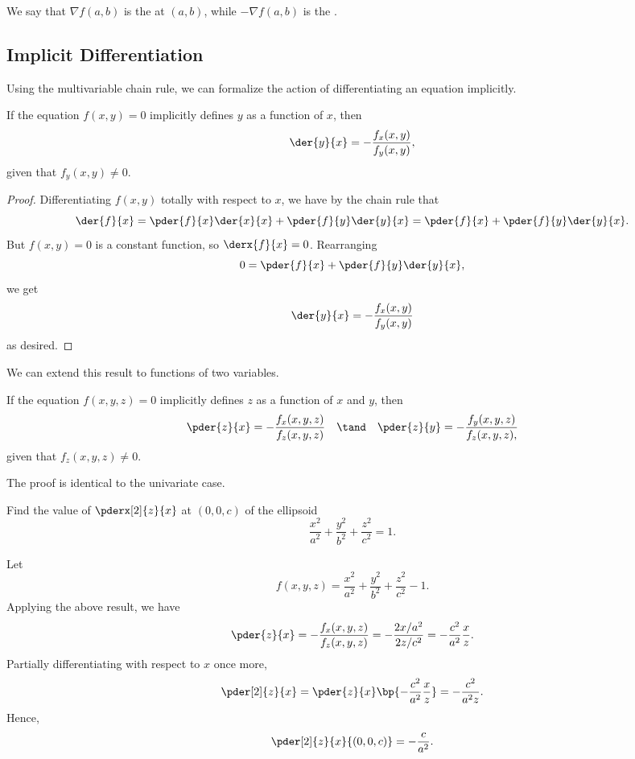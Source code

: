 We say that $\nabla f(a,b)$ is the  at $(a, b)$, while $-\nabla f(a, b)$ is the .

\subsection{Implicit Differentiation}

Using the multivariable chain rule, we can formalize the action of differentiating an equation implicitly.

\begin{proposition}
    If the equation $f(x, y) = 0$ implicitly defines $y$ as a function of $x$, then \[\der{y}{x} = -\frac{f_x(x, y)}{f_y(x,  y)},\] given that $f_y(x, y) \neq 0$.
\end{proposition}
\begin{proof}
    Differentiating $f(x, y)$ totally with respect to $x$, we have by the chain rule that \[\der{f}{x} = \pder{f}{x} \der{x}{x} + \pder{f}{y} \der{y}{x} = \pder{f}{x} + \pder{f}{y} \der{y}{x}.\] But $f(x, y) = 0$ is a constant function, so $\derx{f}{x} = 0$. Rearranging \[0 =\pder{f}{x} + \pder{f}{y} \der{y}{x},\] we get \[\der{y}{x} = -\frac{f_x(x, y)}{f_y(x,  y)}\] as desired.
\end{proof}

We can extend this result to functions of two variables.
\begin{proposition}
    If the equation $f(x, y, z) = 0$ implicitly defines $z$ as a function of $x$ and $y$, then \[\pder{z}{x} = -\frac{f_x(x, y, z)}{f_z(x,  y, z)} \quad \tand \quad \pder{z}{y} = -\frac{f_y(x, y, z)}{f_z(x, y, z),}\] given that $f_z(x, y, z) \neq 0$.
\end{proposition}
The proof is identical to the univariate case.

\begin{sample}
    Find the value of $\pderx[2]{z}{x}$ at $(0, 0, c)$ of the ellipsoid \[\frac{x^2}{a^2} + \frac{y^2}{b^2} + \frac{z^2}{c^2} = 1.\]
\end{sample}
\begin{sampans}
    Let \[f(x, y, z) = \frac{x^2}{a^2} + \frac{y^2}{b^2} + \frac{z^2}{c^2} - 1.\] Applying the above result, we have \[\pder{z}{x} = -\frac{f_x(x, y, z)}{f_z(x,  y, z)} = -\frac{2x / a^2}{2z / c^2} = -\frac{c^2}{a^2} \frac{x}{z}.\] Partially differentiating with respect to $x$ once more, \[\pder[2]{z}{x} = \pder{z}{x} \bp{-\frac{c^2}{a^2} \frac{x}{z}} = -\frac{c^2}{a^2 z}.\] Hence, \[\pder[2]{z}{x}{(0, 0, c)} = -\frac{c}{a^2}.\]
\end{sampans}

